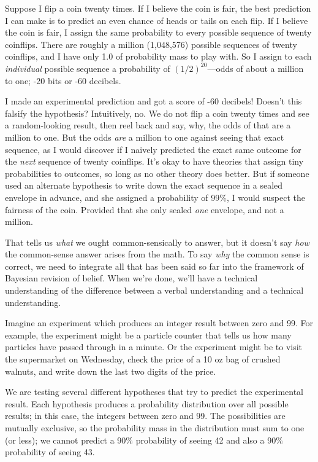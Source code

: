 \hr

{
 Suppose I flip a coin twenty times. If I believe the coin is fair,
the best prediction I can make is to predict an even chance of heads or
tails on each flip. If I believe the coin is fair, I assign the same
probability to every possible sequence of twenty coinflips. There are
roughly a million (1,048,576) possible sequences of twenty coinflips,
and I have only 1.0 of probability mass to play with. So I assign to
each \textit{individual} possible sequence a probability of
$(1/2)^{20}$---odds of about a million to one; -20
bits or -60 decibels.}

{
 I made an experimental prediction and got a score of -60 decibels!
Doesn't this falsify the hypothesis? Intuitively, no.
We do not flip a coin twenty times and see a random-looking result,
then reel back and say, why, the odds of that are a million to one. But
the odds \textit{are} a million to one against seeing that exact
sequence, as I would discover if I naively predicted the exact same
outcome for the \textit{next} sequence of twenty coinflips.
It's okay to have theories that assign tiny
probabilities to outcomes, so long as no other theory does better. But
if someone used an alternate hypothesis to write down the exact
sequence in a sealed envelope in advance, and she assigned a
probability of 99\%, I would suspect the fairness of the coin. Provided
that she only sealed \textit{one} envelope, and not a million.}

{
 That tells us \textit{what} we ought common-sensically to answer,
but it doesn't say \textit{how} the common-sense answer
arises from the math. To say \textit{why} the common sense is correct,
we need to integrate all that has been said so far into the framework
of Bayesian revision of belief. When we're done,
we'll have a technical understanding of the difference
between a verbal understanding and a technical understanding.}

\hr

{
 Imagine an experiment which produces an integer result between
zero and 99. For example, the experiment might be a particle counter
that tells us how many particles have passed through in a minute. Or
the experiment might be to visit the supermarket on Wednesday, check
the price of a 10 oz bag of crushed walnuts, and write down the last
two digits of the price.}

{
 We are testing several different hypotheses that try to predict
the experimental result. Each hypothesis produces a probability
distribution over all possible results; in this case, the integers
between zero and 99. The possibilities are mutually exclusive, so the
probability mass in the distribution must sum to one (or less); we
cannot predict a 90\% probability of seeing 42 and also a 90\%
probability of seeing 43.}

